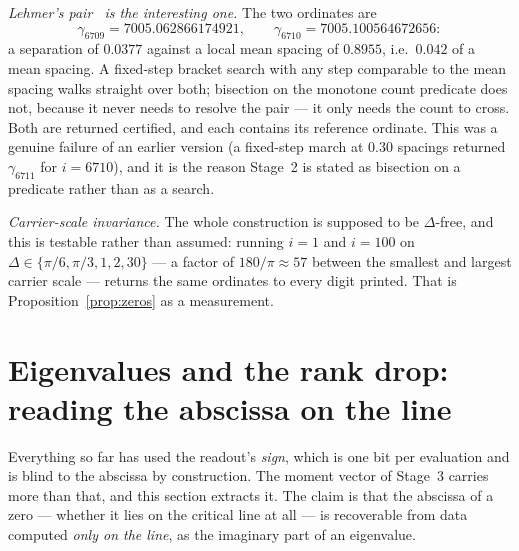 \documentclass[11pt]{article}
\theoremstyle{plain}
\theoremstyle{definition}
\theoremstyle{remark}
\begin{document}
\noindent\emph{Lehmer's pair~\cite{Lehmer1956} is the interesting one.} The two ordinates are
\[
  \gamma_{6709}=7005.062866174921,\qquad \gamma_{6710}=7005.100564672656:
\]
a separation of $0.0377$ against a local
mean spacing of $0.8955$, i.e.\ $0.042$ of a mean spacing. A fixed-step bracket search
with any step comparable to the mean spacing walks straight over both; bisection on the
monotone count predicate does not, because it never needs to resolve the pair --- it
only needs the count to cross. Both are returned certified, and each contains its
reference ordinate. This was a genuine failure of an earlier version (a fixed-step
march at $0.30$ spacings returned $\gamma_{6711}$ for $i=6710$), and it is the reason
Stage~2 is stated as bisection on a predicate rather than as a search.

\emph{Carrier-scale invariance.} The whole construction is supposed to be
$\Delta$-free, and this is testable rather than assumed: running $i=1$ and $i=100$ on
$\Delta\in\{\pi/6,\pi/3,1,2,30\}$ --- a factor of $180/\pi\approx57$ between the
smallest and largest carrier scale --- returns the same ordinates to every digit
printed. That is Proposition~\ref{prop:zeros} as a measurement.

\section{Eigenvalues and the rank drop: reading the abscissa on the
line}\label{sec:pencil}

Everything so far has used the readout's \emph{sign}, which is one bit per evaluation
and is blind to the abscissa by construction. The moment vector of Stage~3 carries
more than that, and this section extracts it. The claim is that the abscissa of a zero
--- whether it lies on the critical line at all --- is recoverable from data computed
\emph{only on the line}, as the imaginary part of an eigenvalue.
\end{document}
